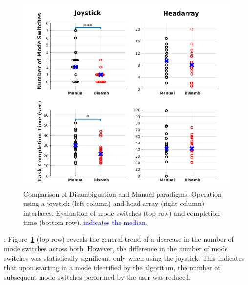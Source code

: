 \documentclass[conference]{IEEEtran}
\begin{document}
\begin{figure}[t]
	\centering
	\includegraphics[width = 1.1\hsize,center]{./figures/FINAL_PLOT.png}
	\vspace{-0.7cm}
	\caption{Comparison of Disambiguation and Manual paradigms. Operation using a joystick (left column) and head array (right column) interfaces. Evaluation of mode switches (top row) and completion time (bottom row). \textcolor{blue}{{} indicates the median.}}
	\label{DATAPLOT}
\end{figure}
\vspace{0.1cm}
: Figure~\ref{DATAPLOT} (top row) reveals the general trend of a decrease in the number of mode switches across both. However, the difference in the number of mode switches was statistically significant only when using the joystick. This indicates that upon starting in a mode identified by the algorithm, the number of subsequent mode switches performed by the user was reduced. 
\end{document}
